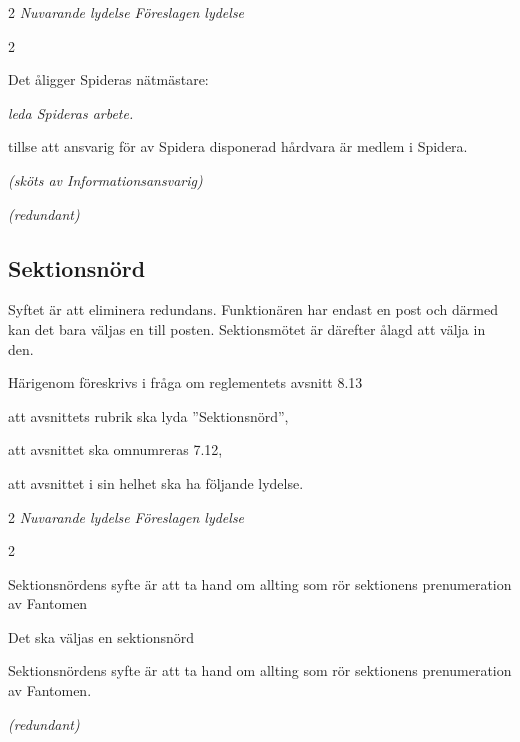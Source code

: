 \documentclass{article}
\newenvironment{lydelse}
    {\begin{paracol}{2}%
        \emph{Nuvarande lydelse}%
        \switchcolumn%
        \emph{Föreslagen lydelse}%
    \end{paracol}%
    \begin{enumerate}[label=\thesubsection.\arabic*]%
    \begin{paracol}{2}%
    }{\end{paracol}\end{enumerate}}
\begin{document}
\begin{lydelse}
    \item Det åligger Spideras nätmästare:
    \begin{aligganden}
        \vspace{-0.4em}
    	\item \emph{leda Spideras arbete.}\vspace{0.2em}
        \item tillse att ansvarig för av Spidera disponerad hårdvara är medlem i Spidera.\vspace{0.4em}
        \item[] \emph{(sköts av Informationsansvarig)}\vspace{1.4em}
        \item[] \emph{(redundant)}
    \end{aligganden}
    
\end{lydelse}

\subsection{Sektionsnörd}
Syftet är att eliminera redundans.
Funktionären har endast en post och därmed kan det bara väljas en till posten.
Sektionsmötet är därefter ålagd att välja in den.

Härigenom föreskrivs i fråga om reglementets avsnitt 8.13

\begin{dels}
    \item att avsnittets rubrik ska lyda ''Sektionsnörd'',
    \item att avsnittet ska omnumreras 7.12,
    \item att avsnittet i sin helhet ska ha följande lydelse.
\end{dels}
\begin{lydelse}
    \setcounter{section}{8}
    \setcounter{subsection}{13}
    
    \item Sektionsnördens syfte är att ta hand om allting som rör sektionens prenumeration av Fantomen

	\item Det ska väljas en sektionsnörd
    
    \setcounter{section}{7}
    \setcounter{subsection}{12}
    \switchcolumn
    
    \item Sektionsnördens syfte är att ta hand om allting som rör sektionens prenumeration av Fantomen.
    
    \item[] \emph{(redundant)}
    
\end{lydelse}
\end{document}
